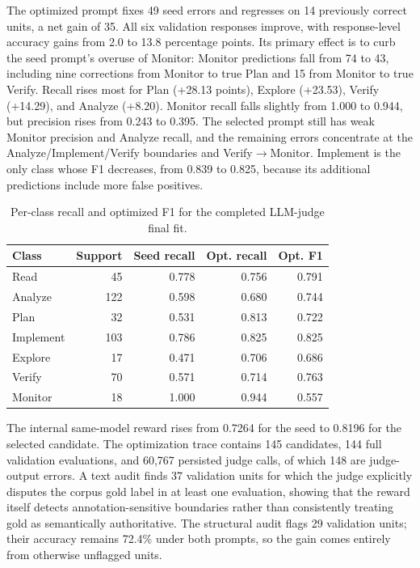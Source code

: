 The optimized prompt fixes 49 seed errors and regresses on 14 previously
correct units, a net gain of 35.  All six validation responses improve, with
response-level accuracy gains from 2.0 to 13.8 percentage points.  Its primary
effect is to curb the seed prompt's overuse of Monitor: Monitor predictions
fall from 74 to 43, including nine corrections from Monitor to true Plan and
15 from Monitor to true Verify.  Recall rises most for Plan (+28.13 points),
Explore (+23.53), Verify (+14.29), and Analyze (+8.20).  Monitor recall falls
slightly from 1.000 to 0.944, but precision rises from 0.243 to 0.395.  The
selected prompt still has weak Monitor precision and Analyze recall, and the
remaining errors concentrate at the Analyze/Implement/Verify boundaries and
Verify$\rightarrow$Monitor.  Implement is the only class whose F1 decreases,
from 0.839 to 0.825, because its additional predictions include more false
positives.

\begin{table}[t]
\centering
\caption{Per-class recall and optimized F1 for the completed LLM-judge final
fit.  }
\label{tab:exp0a-llmjudge-classes}
\begin{tabular}{lrrrr}
\toprule
Class & Support & Seed recall & Opt. recall & Opt. F1 \\
\midrule
Read      &  45 & 0.778 & 0.756 & 0.791 \\
Analyze   & 122 & 0.598 & 0.680 & 0.744 \\
Plan      &  32 & 0.531 & 0.813 & 0.722 \\
Implement & 103 & 0.786 & 0.825 & 0.825 \\
Explore   &  17 & 0.471 & 0.706 & 0.686 \\
Verify    &  70 & 0.571 & 0.714 & 0.763 \\
Monitor   &  18 & 1.000 & 0.944 & 0.557 \\
\bottomrule
\end{tabular}
\end{table}

The internal same-model reward rises from 0.7264 for the seed to 0.8196 for
the selected candidate.  The optimization trace contains 145 candidates, 144
full validation evaluations, and 60,767 persisted judge calls, of which 148
are judge-output errors.  A text audit finds 37 validation units for which the
judge explicitly disputes the corpus gold label in at least one evaluation,
showing that the reward itself detects annotation-sensitive boundaries rather
than consistently treating gold as semantically authoritative.  The structural
audit flags 29 validation units; their accuracy remains 72.4\% under both
prompts, so the gain comes entirely from otherwise unflagged units.

